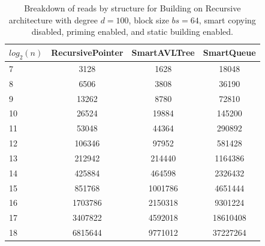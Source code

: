 \begin{table}[]
\centering
\begin{tabular}{|l|c|c|c|}
$log_2(n)$ & RecursivePointer & SmartAVLTree & SmartQueue \\ \hline
7 & 3128 & 1628 & 18048 \\ \hline
8 & 6506 & 3808 & 36190 \\ \hline
9 & 13262 & 8780 & 72810 \\ \hline
10 & 26524 & 19884 & 145200 \\ \hline
11 & 53048 & 44364 & 290892 \\ \hline
12 & 106346 & 97952 & 581428 \\ \hline
13 & 212942 & 214440 & 1164386 \\ \hline
14 & 425884 & 464598 & 2326432 \\ \hline
15 & 851768 & 1001786 & 4651444 \\ \hline
16 & 1703786 & 2150318 & 9301224 \\ \hline
17 & 3407822 & 4592018 & 18610408 \\ \hline
18 & 6815644 & 9771012 & 37227264 \\ \hline
\end{tabular}
\caption{Breakdown of reads by structure for Building on Recursive architecture with degree $d=100$, block size $bs=64$, smart copying disabled, priming enabled, and static building enabled.}
    \label{tab:reads_by_structure_build_d100_bs64_copiesfalse_primetrue_staticinsertiontrue_ptrecursive_movetrue}
\end{table}

